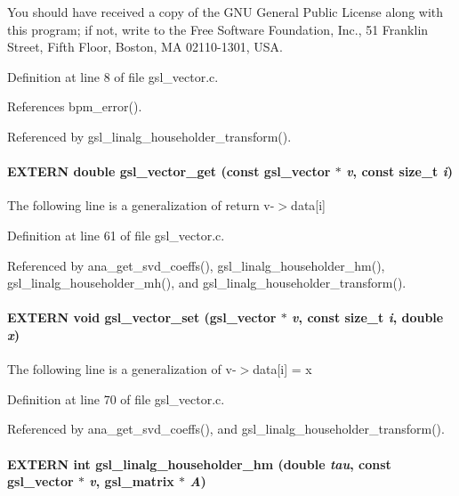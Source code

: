 You should have received a copy of the GNU General Public License along with this program; if not, write to the Free Software Foundation, Inc., 51 Franklin Street, Fifth Floor, Boston, MA 02110-1301, USA. 

Definition at line 8 of file gsl\_\-vector.c.

References bpm\_\-error().

Referenced by gsl\_\-linalg\_\-householder\_\-transform().
\paragraph[gsl\_\-vector\_\-get]{\setlength{\rightskip}{0pt plus 5cm}EXTERN double gsl\_\-vector\_\-get (const gsl\_\-vector $\ast$ {\em v}, \/  const size\_\-t {\em i})}\hfill\label{group__nr_g73bcc5991727aba2ebda472181e93be0}




The following line is a generalization of return v-$>$data[i] 

Definition at line 61 of file gsl\_\-vector.c.

Referenced by ana\_\-get\_\-svd\_\-coeffs(), gsl\_\-linalg\_\-householder\_\-hm(), gsl\_\-linalg\_\-householder\_\-mh(), and gsl\_\-linalg\_\-householder\_\-transform().
\paragraph[gsl\_\-vector\_\-set]{\setlength{\rightskip}{0pt plus 5cm}EXTERN void gsl\_\-vector\_\-set (gsl\_\-vector $\ast$ {\em v}, \/  const size\_\-t {\em i}, \/  double {\em x})}\hfill\label{group__nr_g12d75982ae8a683cbc5b4875fd4167c5}




The following line is a generalization of v-$>$data[i] = x 

Definition at line 70 of file gsl\_\-vector.c.

Referenced by ana\_\-get\_\-svd\_\-coeffs(), and gsl\_\-linalg\_\-householder\_\-transform().
\paragraph[gsl\_\-linalg\_\-householder\_\-hm]{\setlength{\rightskip}{0pt plus 5cm}EXTERN int gsl\_\-linalg\_\-householder\_\-hm (double {\em tau}, \/  const gsl\_\-vector $\ast$ {\em v}, \/  gsl\_\-matrix $\ast$ {\em A})}\hfill\label{group__nr_g7fafbf5e527f8f7bb034f8065f3c8d75}




